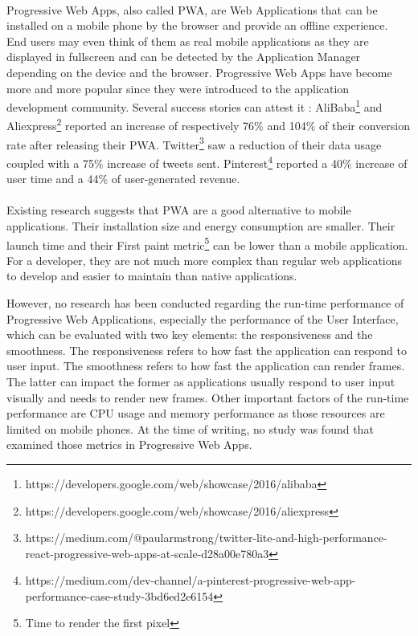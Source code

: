 \documentclass{kththesis}
\begin{document}
\paragraph{}
Progressive Web Apps, also called PWA, are Web Applications that can be installed on a mobile phone by the browser and provide an offline experience. End users may even think of them as real mobile applications as they are displayed in fullscreen and can be detected by the Application Manager depending on the device and the browser.
Progressive Web Apps have become more and more popular since they were introduced to the application development community. Several success stories can attest it : AliBaba\footnote{https://developers.google.com/web/showcase/2016/alibaba} and Aliexpress\footnote{https://developers.google.com/web/showcase/2016/aliexpress} reported an increase of respectively 76\% and 104\% of their conversion rate after releasing their PWA. Twitter\footnote{https://medium.com/@paularmstrong/twitter-lite-and-high-performance-react-progressive-web-apps-at-scale-d28a00e780a3} saw a reduction of their data usage coupled with a 75\% increase of tweets sent. Pinterest\footnote{https://medium.com/dev-channel/a-pinterest-progressive-web-app-performance-case-study-3bd6ed2e6154} reported a 40\% increase of user time and a 44\% of user-generated revenue.

\paragraph{}
Existing research suggests that PWA are a good alternative to mobile applications. Their installation size and energy consumption are  smaller\cite{PWAapplicability}. Their launch time \cite{Biorn-Hansen2} and their First paint metric\footnote{Time to render the first pixel}\cite{PWAapplicability} can be lower than a mobile application. For a developer, they are not much more complex than regular web applications to develop\cite{JohannsenFabian2018PWAa} and easier to maintain than native applications. \newline

However, no research has been conducted regarding the run-time performance of Progressive Web Applications, especially the performance of the User Interface, which can be evaluated with two key elements: the responsiveness and the smoothness. The responsiveness refers to how fast the application can respond to user input. The smoothness refers to how fast the application can render frames. The latter can impact the former as applications usually respond to user input visually and needs to render new frames. Other important factors of the run-time performance are CPU usage and memory performance as those resources are limited on mobile phones. At the time of writing, no study was found that examined those metrics in Progressive Web Apps.
\end{document}
